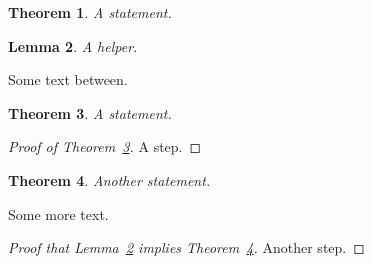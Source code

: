\documentclass{article}
\newtheorem{theorem}{Theorem}
\newtheorem{lemma}[theorem]{Lemma}
\begin{document}
\begin{theorem}\label{main}
A statement.
\end{theorem}
\begin{lemma}\label{aux}
A helper.
\end{lemma}
Some text between.

\begin{theorem}\label{main}
A statement.
\end{theorem}
\begin{proof}[Proof of Theorem~\ref{main}]
A step.
\end{proof}
\begin{theorem}\label{other}
Another statement.
\end{theorem}
Some more text.

\begin{proof}[Proof that Lemma~\ref{aux} implies Theorem~\ref{other}]
Another step.
\end{proof}
\end{document}
